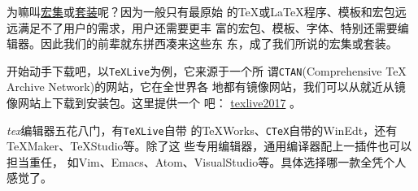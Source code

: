 为嘛叫\uline{宏集}或\uline{套装}呢？因为一般只有最原始
的\TeX{}或\LaTeX{}程序、模板和宏包远远满足不了用户的需求，用户还需要更丰
富的宏包、模板、字体、特别还需要编辑器。因此我们的前辈就东拼西凑来这些东
东，成了我们所说的宏集或套装。

开始动手下载吧，以\texttt{TeXLive}为例，它来源于一个所
谓\texttt{CTAN}(Comprehensive \TeX{} Archive Network)的网站，它在全世界各
地都有镜像网站，我们可以从就近从镜像网站上下载到安装包。这里提供一个
吧：
\href{http://mirrors.ustc.edu.cn/CTAN/systems/texlive/Images/texlive2017.iso}{texlive2017}
。

\textit{tex}编辑器五花八门，有\texttt{TeXLive}自带
的TeXWorks、\texttt{CTeX}自带的WinEdt，还有TeXMaker、TeXStudio等。除了这
些专用编辑器，通用编译器配上一插件也可以担当重任，
如Vim、Emacs、Atom、VisualStudio等。具体选择哪一款全凭个人感觉了。

